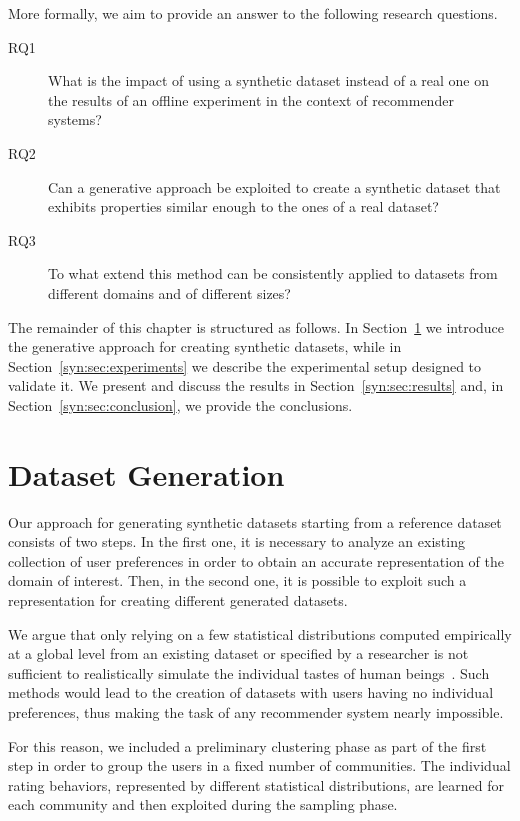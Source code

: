 More formally, we aim to provide an answer to the following research questions.

\begin{description}
\item[RQ1\label{syn:itm:rq1}] What is the impact of using a synthetic dataset instead of a real one on the results of an offline experiment in the context of recommender systems?
\item[RQ2\label{syn:itm:rq2}] Can a generative approach be exploited to create a synthetic dataset that exhibits properties similar enough to the ones of a real dataset?
\item[RQ3\label{syn:itm:rq3}] To what extend this method can be consistently applied to datasets from different domains and of different sizes?
\end{description}

The remainder of this chapter is structured as follows. In Section~\ref{syn:sec:generation} we introduce the generative approach for creating synthetic datasets, while in Section~\ref{syn:sec:experiments} we describe the experimental setup designed to validate it. We present and discuss the results in Section~\ref{syn:sec:results} and, in Section~\ref{syn:sec:conclusion}, we provide the conclusions.

\section{Dataset Generation}
\label{syn:sec:generation}

Our approach for generating synthetic datasets starting from a reference dataset consists of two steps. In the first one, it is necessary to analyze an existing collection of user preferences in order to obtain an accurate representation of the domain of interest. Then, in the second one, it is possible to exploit such a representation for creating different generated datasets.

We argue that only relying on a few statistical distributions computed empirically at a global level from an existing dataset or specified by a researcher is not sufficient to realistically simulate the individual tastes of human beings~\cite{Montaner2004}. Such methods would lead to the creation of datasets with users having no individual preferences, thus making the task of any recommender system nearly impossible.

For this reason, we included a preliminary clustering phase as part of the first step in order to group the users in a fixed number of communities. The individual rating behaviors, represented by different statistical distributions, are learned for each community and then exploited during the sampling phase.

